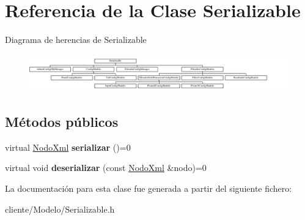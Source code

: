\hypertarget{classSerializable}{\section{\-Referencia de la \-Clase \-Serializable}
\label{classSerializable}
}
\-Diagrama de herencias de \-Serializable\begin{figure}[H]
\begin{center}
\leavevmode
\includegraphics[height=1.623188cm]{classSerializable}
\end{center}
\end{figure}
\subsection*{\-Métodos públicos}
\begin{DoxyCompactItemize}
\item 
\hypertarget{classSerializable_aeb9378d80e82e647ab375354afca2073}{virtual \hyperlink{classTiXmlElement}{\-Nodo\-Xml} {\bfseries serializar} ()=0}\label{classSerializable_aeb9378d80e82e647ab375354afca2073}

\item 
\hypertarget{classSerializable_a1dfe38ce1a844dd3e660393e9bfe76d1}{virtual void {\bfseries deserializar} (const \hyperlink{classTiXmlElement}{\-Nodo\-Xml} \&nodo)=0}\label{classSerializable_a1dfe38ce1a844dd3e660393e9bfe76d1}

\end{DoxyCompactItemize}


\-La documentación para esta clase fue generada a partir del siguiente fichero\-:\begin{DoxyCompactItemize}
\item 
cliente/\-Modelo/\-Serializable.\-h\end{DoxyCompactItemize}
